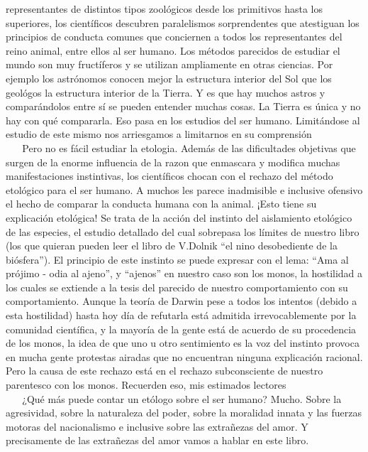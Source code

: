 representantes de distintos tipos zoológicos desde los primitivos hasta
los superiores, los científicos descubren paralelismos sorprendentes que
atestiguan los principios de conducta comunes que conciernen a todos los
representantes del reino animal, entre ellos al ser humano. Los métodos
parecidos de estudiar el mundo son muy fructíferos y se utilizan
ampliamente en otras ciencias. Por ejemplo los astrónomos conocen mejor
la estructura interior del Sol que los geológos la estructura interior
de la Tierra. Y es que hay muchos astros y comparándolos entre sí se
pueden entender muchas cosas. La Tierra es única y no hay con qué
compararla. Eso pasa en los estudios del ser humano. Limitándose al
estudio de este mismo nos arriesgamos a limitarnos en su comprensión\\
\hspace*{0.333em} ~ ~ Pero no es fácil estudiar la etologia. Además de
las dificultades objetivas que surgen de la enorme influencia de la
razon que enmascara y modifica muchas manifestaciones instintivas, los
científicos chocan con el rechazo del método etológico para el ser
humano. A muchos les parece inadmisible e inclusive ofensivo el hecho de
comparar la conducta humana con la animal. ¡Esto tiene su explicación
etológica! Se trata de la acción del instinto del aislamiento etológico
de las especies, el estudio detallado del cual sobrepasa los límites de
nuestro libro (los que quieran pueden leer el libro de V.Dolnik ``el
nino desobediente de la biósfera''). El principio de este instinto se
puede expresar con el lema: ``Ama al prójimo - odia al ajeno'', y
``ajenos'' en nuestro caso son los monos, la hostilidad a los cuales se
extiende a la tesis del parecido de nuestro comportamiento con su
comportamiento. Aunque la teoría de Darwin pese a todos los intentos
(debido a esta hostilidad) hasta hoy día de refutarla está admitida
irrevocablemente por la comunidad científica, y la mayoría de la gente
está de acuerdo de su procedencia de los monos, la idea de que uno u
otro sentimiento es la voz del instinto provoca en mucha gente protestas
airadas que no encuentran ninguna explicación racional. Pero la causa de
este rechazo está en el rechazo subconsciente de nuestro parentesco con
los monos. Recuerden eso, mis estimados lectores\\
\hspace*{0.333em} ~ ~ ¿Qué más puede contar un etólogo sobre el ser
humano? Mucho. Sobre la agresividad, sobre la naturaleza del poder,
sobre la moralidad innata y las fuerzas motoras del nacionalismo e
inclusive sobre las extrañezas del amor. Y precisamente de las
extrañezas del amor vamos a hablar en este libro.

